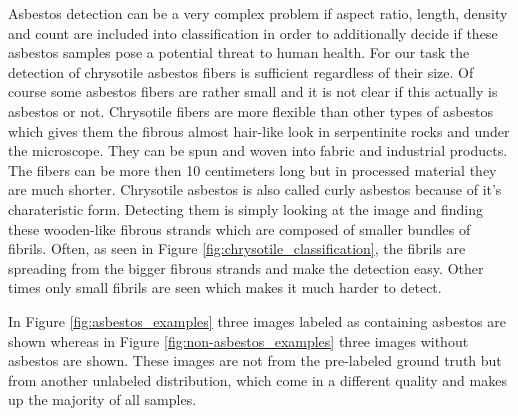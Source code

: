 Asbestos detection can be a very complex problem if  aspect ratio, length, density and count are included into classification in order to additionally decide if these asbestos samples pose a potential threat to human health. For our task the detection of chrysotile asbestos fibers is sufficient regardless of their size. Of course some asbestos fibers are rather small and it is not clear if this actually is asbestos or not. Chrysotile fibers are more flexible than  other types of asbestos which gives them the fibrous almost hair-like look in serpentinite rocks and under the microscope. They can be spun and woven into fabric and industrial products. The fibers can be more then 10 centimeters  long but in processed material they are much shorter. Chrysotile asbestos is also called curly asbestos because of it's charateristic form. Detecting  them is simply looking at the image and finding these wooden-like fibrous strands which are composed of smaller bundles of fibrils. Often, as  seen in Figure \ref{fig:chrysotile_classification}, the fibrils are spreading  from the bigger fibrous strands and make the detection easy. Other times only small fibrils are seen which makes it much harder to detect.

In Figure \ref{fig:asbestos_examples} three images labeled as containing asbestos are shown whereas in Figure \ref{fig:non-asbestos_examples} three images without asbestos are shown. These images are not from the pre-labeled ground truth but from another unlabeled distribution, which come in a different quality and makes up the majority of all samples. \\

